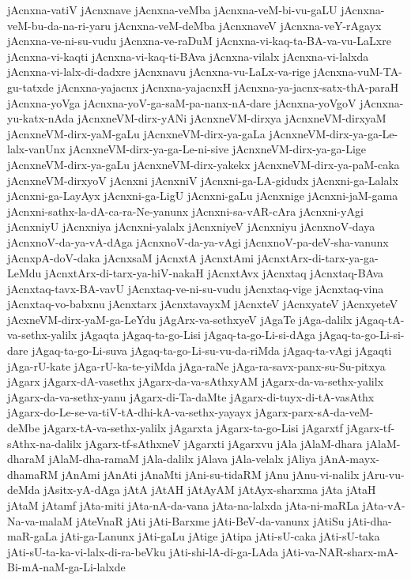 {jAcnxna-vatiV
jAcnxnave
jAcnxna-veMba
jAcnxna-veM-bi-vu-gaLU
jAcnxna-veM-bu-da-na-ri-yaru
jAcnxna-veM-deMba
jAcnxnaveV
jAcnxna-veY-rAgayx
jAcnxna-ve-ni-su-vudu
jAcnxna-ve-raDuM
jAcnxna-vi-kaq-ta-BA-va-vu-LaLxre
jAcnxna-vi-kaqti
jAcnxna-vi-kaq-ti-BAva
jAcnxna-vilalx
jAcnxna-vi-lalxda
jAcnxna-vi-lalx-di-dadxre
jAcnxnavu
jAcnxna-vu-LaLx-va-rige
jAcnxna-vuM-TA-gu-tatxde
jAcnxna-yajacnx
jAcnxna-yajacnxH
jAcnxna-ya-jacnx-satx-thA-paraH
jAcnxna-yoVga
jAcnxna-yoV-ga-saM-pa-nanx-nA-dare
jAcnxna-yoVgoV
jAcnxna-yu-katx-nAda
jAcnxneVM-dirx-yANi
jAcnxneVM-dirxya
jAcnxneVM-dirxyaM
jAcnxneVM-dirx-yaM-gaLu
jAcnxneVM-dirx-ya-gaLa
jAcnxneVM-dirx-ya-ga-Le-lalx-vanUnx
jAcnxneVM-dirx-ya-ga-Le-ni-sive
jAcnxneVM-dirx-ya-ga-Lige
jAcnxneVM-dirx-ya-gaLu
jAcnxneVM-dirx-yakekx
jAcnxneVM-dirx-ya-paM-caka
jAcnxneVM-dirxyoV
jAcnxni
jAcnxniV
jAcnxni-ga-LA-gidudx
jAcnxni-ga-Lalalx
jAcnxni-ga-LayAyx
jAcnxni-ga-LigU
jAcnxni-gaLu
jAcnxnige
jAcnxni-jaM-gama
jAcnxni-sathx-la-dA-ca-ra-Ne-yanunx
jAcnxni-sa-vAR-cAra
jAcnxni-yAgi
jAcnxniyU
jAcnxniya
jAcnxni-yalalx
jAcnxniyeV
jAcnxniyu
jAcnxnoV-daya
jAcnxnoV-da-ya-vA-dAga
jAcnxnoV-da-ya-vAgi
jAcnxnoV-pa-deV-sha-vanunx
jAcnxpA-doV-daka
jAcnxsaM
jAcnxtA
jAcnxtAmi
jAcnxtArx-di-tarx-ya-ga-LeMdu
jAcnxtArx-di-tarx-ya-hiV-nakaH
jAcnxtAvx
jAcnxtaq
jAcnxtaq-BAva
jAcnxtaq-tavx-BA-vavU
jAcnxtaq-ve-ni-su-vudu
jAcnxtaq-vige
jAcnxtaq-vina
jAcnxtaq-vo-babxnu
jAcnxtarx
jAcnxtavayxM
jAcnxteV
jAcnxyateV
jAcnxyeteV
jAcxneVM-dirx-yaM-ga-LeYdu
jAgArx-va-sethxyeV
jAgaTe
jAga-dalilx
jAgaq-tA-va-sethx-yalilx
jAgaqta
jAgaq-ta-go-Lisi
jAgaq-ta-go-Li-si-dAga
jAgaq-ta-go-Li-si-dare
jAgaq-ta-go-Li-suva
jAgaq-ta-go-Li-su-vu-da-riMda
jAgaq-ta-vAgi
jAgaqti
jAga-rU-kate
jAga-rU-ka-te-yiMda
jAga-raNe
jAga-ra-savx-panx-su-Su-pitxya
jAgarx
jAgarx-dA-vasethx
jAgarx-da-va-sAthxyAM
jAgarx-da-va-sethx-yalilx
jAgarx-da-va-sethx-yanu
jAgarx-di-Ta-daMte
jAgarx-di-tuyx-di-tA-vasAthx
jAgarx-do-Le-se-va-tiV-tA-dhi-kA-va-sethx-yayayx
jAgarx-parx-sA-da-veM-deMbe
jAgarx-tA-va-sethx-yalilx
jAgarxta
jAgarx-ta-go-Lisi
jAgarxtf
jAgarx-tf-sAthx-na-dalilx
jAgarx-tf-sAthxneV
jAgarxti
jAgarxvu
jAla
jAlaM-dhara
jAlaM-dharaM
jAlaM-dha-ramaM
jAla-dalilx
jAlava
jAla-velalx
jAliya
jAnA-mayx-dhamaRM
jAnAmi
jAnAti
jAnaMti
jAni-su-tidaRM
jAnu
jAnu-vi-nalilx
jAru-vu-deMda
jAsitx-yA-dAga
jAtA
jAtAH
jAtAyAM
jAtAyx-sharxma
jAta
jAtaH
jAtaM
jAtamf
jAta-miti
jAta-nA-da-vana
jAta-na-lalxda
jAta-ni-maRLa
jAta-vA-Na-va-malaM
jAteVnaR
jAti
jAti-Barxme
jAti-BeV-da-vanunx
jAtiSu
jAti-dha-maR-gaLa
jAti-ga-Lanunx
jAti-gaLu
jAtige
jAtipa
jAti-sU-caka
jAti-sU-taka
jAti-sU-ta-ka-vi-lalx-di-ra-beVku
jAti-shi-lA-di-ga-LAda
jAti-va-NAR-sharx-mA-Bi-mA-naM-ga-Li-lalxde
}
